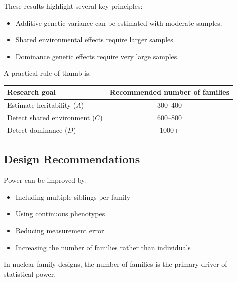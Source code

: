 These results highlight several key principles:

\begin{itemize}
\item Additive genetic variance can be estimated with moderate samples.
\item Shared environmental effects require larger samples.
\item Dominance genetic effects require very large samples.
\end{itemize}

A practical rule of thumb is:

\begin{center}
\begin{tabular}{lc}
\toprule
Research goal & Recommended number of families \\
\midrule
Estimate heritability ($A$) & 300--400 \\
Detect shared environment ($C$) & 600--800 \\
Detect dominance ($D$) & 1000+ \\
\bottomrule
\end{tabular}
\end{center}

\subsection{Design Recommendations}

Power can be improved by:

\begin{itemize}
\item Including multiple siblings per family
\item Using continuous phenotypes
\item Reducing measurement error
\item Increasing the number of families rather than individuals
\end{itemize}

In nuclear family designs, the number of families is the primary driver
of statistical power.
